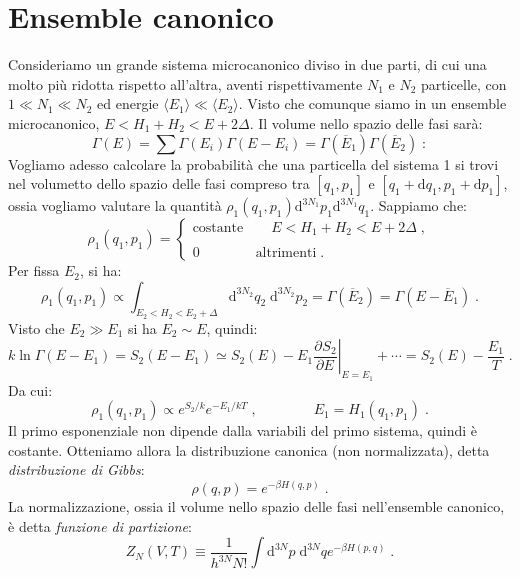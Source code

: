 \documentclass[10pt,a4paper]{report}
\theoremstyle{definition}
\newcommand{\pdev}[3][]{\frac{\partial^{#1} #2}{\partial #3^{#1}}}
\numberwithin{equation}{section}
\newcommand{\diff}[1][]{\mathrm{d}#1}
\newcommand{\bra}{\langle}
\newcommand{\ket}{\rangle}
\begin{document}
\section{Ensemble canonico}
Consideriamo un grande sistema microcanonico diviso in due parti, di cui una molto più ridotta rispetto all'altra, aventi rispettivamente $N_1$ e $N_2$ particelle, con $1\ll N_1\ll N_2$ ed energie $\bra E_1\ket \ll \bra E_2\ket$. Visto che comunque siamo in un ensemble microcanonico, $E<H_1+H_2<E+2\Delta$. Il volume nello spazio delle fasi sarà:
$$
\Gamma(E)=\sum \Gamma(E_i)\Gamma(E-E_i)=\Gamma(\overline{E}_1)\Gamma(\overline{E}_2)\;:
$$
Vogliamo adesso calcolare la probabilità che una particella del sistema 1 si trovi nel volumetto dello spazio delle fasi compreso tra $[q_1,p_1]$ e $[q_1+\diff{q_1},p_1+\diff{p_1}]$, ossia vogliamo valutare la quantità $\rho_1(q_1,p_1)\diff^{3N_1}{p_1}\diff^{3N_1}{q_1}$. Sappiamo che:
\begin{equation}
\rho_1(q_1,p_1)=\begin{cases}
\mbox{costante}\qquad E<H_1+H_2<E+2\Delta\;, \\
\\
0 \qquad\qquad \mbox{altrimenti}\;.
\end{cases}
\end{equation}
Per fissa $E_2$, si ha:
\begin{equation}
\rho_1(q_1,p_1)\propto \int_{E_2<H_2<E_2+\Delta}\diff^{3N_2}{q_2}\;\diff^{3N_2}{p_2}=\Gamma(\overline{E}_2)=\Gamma(E-\overline{E}_1)\;.
\end{equation}
Visto che $E_2\gg E_1$ si ha $E_2\sim E$, quindi:
\begin{equation}
k\ln\Gamma(E-E_1)=S_2(E-E_1)\simeq S_2(E)-E_1\left.\pdev{S_2}{E}\right|_{E=E_1}+\cdots=S_2(E)-\frac{E_1}{T}\;.
\end{equation}
Da cui:
\begin{equation}
\rho_1(q_1,p_1)\propto e^{S_2/k}e^{-E_1/kT}\;,\qquad\qquad E_1=H_1(q_1,p_1)\;.
\end{equation}
Il primo esponenziale non dipende dalla variabili del primo sistema, quindi è costante. Otteniamo allora la distribuzione canonica (non normalizzata), detta \emph{distribuzione di Gibbs}:
\begin{equation}
\rho(q,p)=e^{-\beta H(q,p)}\;.
\end{equation}
La normalizzazione, ossia il volume nello spazio delle fasi nell'ensemble canonico, è detta \emph{funzione di partizione}:
\begin{equation}
Z_N(V,T)\equiv \frac{1}{h^{3N}N!}\int\diff^{3N}{p}\;\diff^{3N}{q} e^{-\beta H(p,q)}\;. \label{ch1_zpartdef}
\end{equation}
\end{document}

